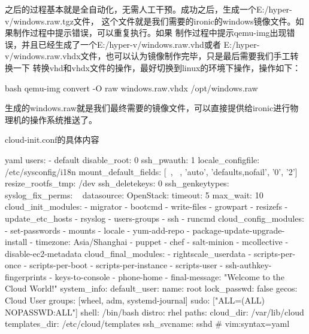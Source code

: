 之后的过程基本就是全自动化，无需人工干预。成功之后，生成一个E:/hyper-v/windows.raw.tgz文件，
这个文件就是我们需要的ironic的windows镜像文件。如果制作过程中提示错误，可以重复执行。如果
制作过程中提示qemu-img出现错误，并且已经生成了一个E:/hyper-v/windows.raw.vhd或者
E:/hyper-v/windows.raw.vhdx文件，也可以认为镜像制作完毕，只是最后需要我们手工转换一下
转换vhd和vhdx文件的操作，最好切换到linux的环境下操作，操作如下：
\begin{code-block}{bash}
qemu-img convert -O raw windows.raw.vhdx /opt/windows.raw
\end{code-block}

生成的windows.raw就是我们最终需要的镜像文件，可以直接提供给ironic进行物理机的操作系统推送了。

cloud-init.conf的具体内容
\begin{code-block}{yaml}
users:
 - default
disable_root: 0
ssh_pwauth:   1
locale_configfile: /etc/sysconfig/i18n
mount_default_fields: [~, ~, 'auto', 'defaults,nofail', '0', '2']
resize_rootfs_tmp: /dev
ssh_deletekeys:   0
ssh_genkeytypes:  ~
syslog_fix_perms: ~
datasource:
  OpenStack:
    timeout: 5
    max_wait: 10
cloud_init_modules:
 - migrator
 - bootcmd
 - write-files
 - growpart
 - resizefs
 - update_etc_hosts
 - rsyslog
 - users-groups
 - ssh
 - runcmd
cloud_config_modules:
 - set-passwords
 - mounts
 - locale
 - yum-add-repo
 - package-update-upgrade-install
 - timezone: Asia/Shanghai
 - puppet
 - chef
 - salt-minion
 - mcollective
 - disable-ec2-metadata
cloud_final_modules:
 - rightscale_userdata
 - scripts-per-once
 - scripts-per-boot
 - scripts-per-instance
 - scripts-user
 - ssh-authkey-fingerprints
 - keys-to-console
 - phone-home
 - final-message: "Welcome to the Cloud World!"
system_info:
  default_user:
    name: root
    lock_passwd: false
    gecos: Cloud User
    groups: [wheel, adm, systemd-journal]
    sudo: ["ALL=(ALL) NOPASSWD:ALL"]
    shell: /bin/bash
  distro: rhel
  paths:
    cloud_dir: /var/lib/cloud
    templates_dir: /etc/cloud/templates
  ssh_svcname: sshd
# vim:syntax=yaml
\end{code-block}

